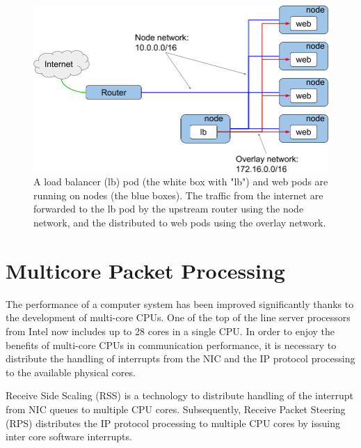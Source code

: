 \begin{figure}[h]
  \centering
  \includegraphics[width=0.8\columnwidth]{Figs/overlay.png}

  \par\bigskip
  \centering
  \begin{minipage}{0.9\columnwidth}
    \caption[A network architecture of container cluster system]{
      A load balancer (lb) pod (the white box with "lb") and web pods are running on nodes (the blue boxes).
      The traffic from the internet are forwarded to the lb pod by the upstream router using the node network,
      and the distributed to web pods using the overlay network.
    }
    \label{fig:overlay}
  \end{minipage}
  
\end{figure}

\FloatBarrier

\section{Multicore Packet Processing}

The performance of a computer system has been improved significantly thanks to the development of multi-core CPUs.
One of the top of the line server processors from Intel now includes up to 28 cores in a single CPU.
In order to enjoy the benefits of multi-core CPUs in communication performance,
it is necessary to distribute the handling of interrupts from the NIC and the IP protocol processing to the available physical cores.

Receive Side Scaling (RSS) \cite{TomHerbert} is a technology 
to distribute handling of the interrupt from NIC queues to multiple CPU cores.
Subsequently, Receive Packet Steering (RPS) \cite{TomHerbert} distributes the IP protocol processing 
to multiple CPU cores by issuing inter core software interrupts.

